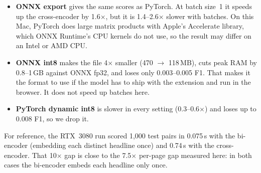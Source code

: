 \begin{itemize}[leftmargin=*]
\item \textbf{ONNX export} gives the same scores as PyTorch. At batch size~1 it speeds up the cross-encoder by 1.6$\times$, but it is 1.4--2.6$\times$ slower with batches. On this Mac, PyTorch does large matrix products with Apple's Accelerate library, which ONNX Runtime's CPU kernels do not use, so the result may differ on an Intel or AMD CPU.
\item \textbf{ONNX int8} makes the file 4$\times$ smaller (470 $\rightarrow$ 118\,MB), cuts peak RAM by 0.8--1\,GB against ONNX fp32, and loses only 0.003--0.005 F1. That makes it the format to use if the model has to ship with the extension and run in the browser. It does not speed up batches here.
\item \textbf{PyTorch dynamic int8} is slower in every setting (0.3--0.6$\times$) and loses up to 0.008 F1, so we drop it.
\end{itemize}

For reference, the RTX~3080 run scored 1,000 test pairs in 0.075\,s with the bi-encoder (embedding each distinct headline once) and 0.74\,s with the cross-encoder. That 10$\times$ gap is close to the 7.5$\times$ per-page gap measured here: in both cases the bi-encoder embeds each headline only once.
